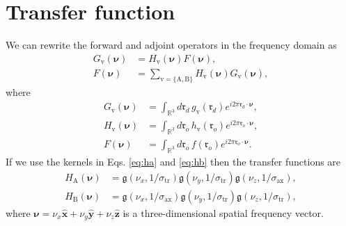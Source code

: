 \documentclass[11pt]{article}
\providecommand{\ro}[1]{\mathbf{\mathfrak{r}}_o}
\providecommand{\rd}[1]{\mathbf{\mathfrak{r}}_d}
\providecommand{\mh}[1]{\mathbf{\hat{#1}}}
\providecommand{\mf}[1]{\mathfrak{#1}}
\providecommand{\mbb}[1]{\mathbb{#1}}
\providecommand{\bs}[1]{\boldsymbol{#1}}
\begin{document}
\section{Transfer function}
We can rewrite the forward and adjoint operators in the frequency domain as
\begin{align}
  G_{\text{v}}(\bs{\nu}) &= H_{\text{v}}(\bs{\nu})F(\bs{\nu}), \label{eq:fwd} \\
  F(\bs{\nu}) &= \sum_{{\text{v}} = \{\text{A}, \text{B}\}}H_{\text{v}}(\bs{\nu})G_{\text{v}}(\bs{\nu}),\label{eq:adj}
\end{align}
where
\begin{align}
  G_{\text{v}}(\bs{\nu}) &= \int_{\mbb{R}^3}d\rd{}\, g_{\text{v}}(\rd{})e^{i2\pi\rd{}\cdot\bs{\nu}},\\
  H_{\text{v}}(\bs{\nu}) &= \int_{\mbb{R}^3}d\ro{}\, h_{\text{v}}(\ro{})e^{i2\pi\ro{}\cdot\bs{\nu}},\\
  F(\bs{\nu}) &= \int_{\mbb{R}^3}d\ro{}\, f(\ro{})e^{i2\pi\ro{}\cdot\bs{\nu}}.
\end{align}
If we use the kernels in Eqs. \ref{eq:ha} and \ref{eq:hb} then the transfer
functions are
\begin{align}
  H_{\text{A}}(\bs{\nu}) &= \mf{g}(\nu_x, 1/\sigma_{\text{tr}})\mf{g}(\nu_y, 1/\sigma_{\text{tr}})\mf{g}(\nu_z, 1/\sigma_{\text{ax}}),\\
  H_{\text{B}}(\bs{\nu}) &= \mf{g}(\nu_x, 1/\sigma_{\text{ax}})\mf{g}(\nu_y, 1/\sigma_{\text{tr}})\mf{g}(\nu_z, 1/\sigma_{\text{tr}}), 
\end{align}
where $\bs{\nu} = \nu_x\mh{x} + \nu_y\mh{y} + \nu_z\mh{z}$ is a
three-dimensional spatial frequency vector.
\end{document}
